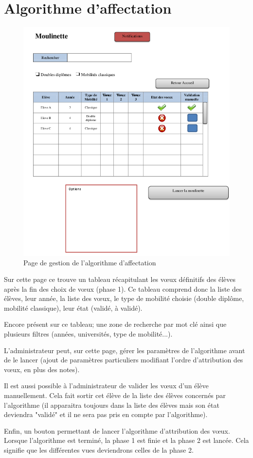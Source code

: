 \section{Algorithme d'affectation}
\label{sec::moulinette}

\begin{figure}[H]
	\includegraphics[scale=0.7]{Admin/Moul.png}
	\caption{Page de gestion de l'algorithme d'affectation}
\end{figure}

Sur cette page ce trouve un tableau récapitulant les vœux définitifs des élèves après la fin des choix de vœux (phase 1). Ce tableau comprend donc la liste des élèves, leur année, la liste des vœux, le type de mobilité choisie (double diplôme, mobilité classique), leur état (validé, à validé).

Encore présent sur ce tableau; une zone de recherche par mot clé ainsi que plusieurs filtres (années, universités, type de mobilité...).

\bigbreak

L'administrateur peut, sur cette page, gérer les paramètres de l'algorithme avant de le lancer (ajout de paramètres particuliers modifiant l'ordre d'attribution des vœux, en plus des notes).

\bigbreak

Il est aussi possible à l'administrateur de valider les vœux d'un élève manuellement. Cela fait sortir cet élève de la liste des élèves concernés par l'algorithme (il apparaitra toujours dans la liste des élèves mais son état deviendra "validé" et il ne sera pas pris en compte par l'algorithme).

\bigbreak

Enfin, un bouton permettant de lancer l'algorithme d'attribution des vœux. Lorsque l'algorithme est terminé, la phase 1 est finie et la phase 2 est lancée. Cela signifie que les différentes vues deviendrons celles de la phase 2.